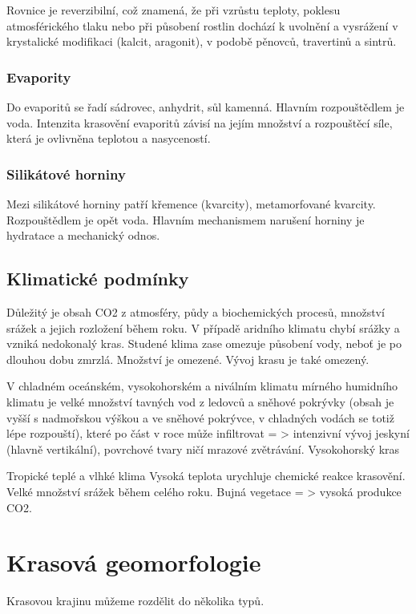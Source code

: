 
Rovnice je reverzibilní, což znamená, že při vzrůstu teploty, poklesu atmosférického tlaku nebo při působení rostlin dochází k uvolnění  a vysrážení  v krystalické modifikaci (kalcit, aragonit), v podobě pěnovců, travertinů a sintrů.

\subsubsection{Evapority}
Do evaporitů se řadí sádrovec, anhydrit, sůl kamenná. Hlavním rozpouštědlem je voda. Intenzita krasovění evaporitů závisí na jejím množství a rozpouštěcí síle, která je ovlivněna teplotou a nasyceností. 

\subsubsection{Silikátové horniny} 
Mezi silikátové horniny patří křemence (kvarcity), metamorfované kvarcity. Rozpouštědlem je opět voda.  Hlavním mechanismem narušení horniny je hydratace a mechanický odnos. 

\subsection{Klimatické podmínky}
Důležitý je obsah CO2 z atmosféry, půdy a biochemických procesů, množství srážek a jejich rozložení během roku. 
V případě aridního klimatu chybí srážky a vzniká nedokonalý kras. Studené klima zase omezuje působení vody, neboť je po dlouhou dobu zmrzlá. Množství  je omezené. Vývoj krasu je také omezený. 

V chladném oceánském, vysokohorském a niválním klimatu mírného humidního klimatu je velké množství tavných vod z ledovců a sněhové pokrývky (obsah  je vyšší s nadmořskou výškou a ve sněhové pokrývce, v chladných vodách se totiž lépe rozpouští), které po část v roce může infiltrovat = > intenzivní vývoj jeskyní (hlavně vertikální), povrchové tvary ničí mrazové zvětrávání. Vysokohorský kras

Tropické teplé a vlhké klima
Vysoká teplota urychluje chemické reakce krasovění. Velké množství srážek během celého roku. Bujná vegetace = > vysoká produkce CO2.

\section{Krasová geomorfologie}
Krasovou krajinu můžeme rozdělit do několika typů. 

